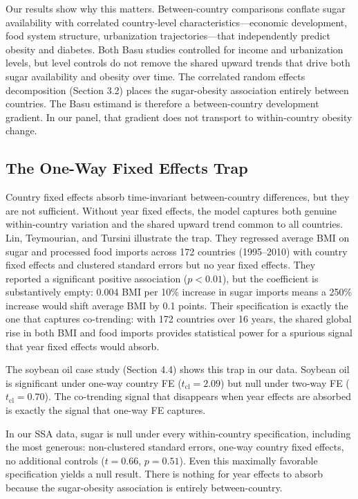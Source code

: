 Our results show why this matters. Between-country comparisons conflate sugar availability with correlated country-level characteristics---economic development, food system structure, urbanization trajectories---that independently predict obesity and diabetes. Both Basu studies controlled for income and urbanization levels, but level controls do not remove the shared upward trends that drive both sugar availability and obesity over time. The correlated random effects decomposition (Section 3.2) places the sugar-obesity association entirely between countries. The Basu estimand is therefore a between-country development gradient. In our panel, that gradient does not transport to within-country obesity change.

\subsection{The One-Way Fixed Effects Trap}

Country fixed effects absorb time-invariant between-country differences, but they are not sufficient. Without year fixed effects, the model captures both genuine within-country variation and the shared upward trend common to all countries. Lin, Teymourian, and Tursini \cite{lin2018} illustrate the trap. They regressed average BMI on sugar and processed food imports across 172 countries (1995--2010) with country fixed effects and clustered standard errors but no year fixed effects. They reported a significant positive association ($p < 0.01$), but the coefficient is substantively empty: 0.004 BMI per 10\% increase in sugar imports means a 250\% increase would shift average BMI by 0.1 points. Their specification is exactly the one that captures co-trending: with 172 countries over 16 years, the shared global rise in both BMI and food imports provides statistical power for a spurious signal that year fixed effects would absorb.

The soybean oil case study (Section 4.4) shows this trap in our data. Soybean oil is significant under one-way country FE ($t_{\text{cl}} = 2.09$) but null under two-way FE ($t_{\text{cl}} = 0.70$). The co-trending signal that disappears when year effects are absorbed is exactly the signal that one-way FE captures.

In our SSA data, sugar is null under every within-country specification, including the most generous: non-clustered standard errors, one-way country fixed effects, no additional controls ($t = 0.66$, $p = 0.51$). Even this maximally favorable specification yields a null result. There is nothing for year effects to absorb because the sugar-obesity association is entirely between-country.

